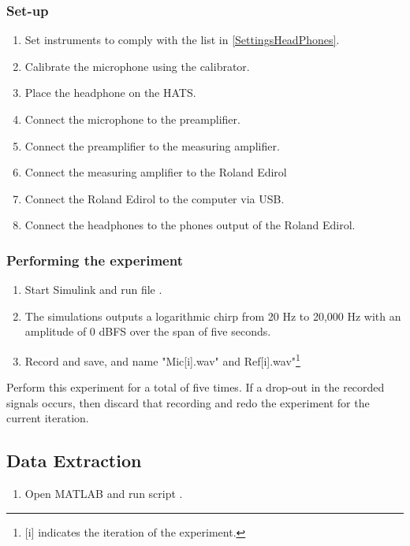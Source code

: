\subsubsection{Set-up}
\begin{enumerate}
	\item Set instruments to comply with the list in \ref{SettingsHeadPhones}.
	\item Calibrate the microphone using the calibrator.
	\item Place the headphone on the HATS.
	\item Connect the microphone to the preamplifier. 
	\item Connect the preamplifier to the measuring amplifier.
	\item Connect the measuring amplifier to the Roland Edirol 
	\item Connect the Roland Edirol to the computer via USB.
	\item Connect the headphones to the phones output of the Roland Edirol.
\end{enumerate}

\subsubsection{Performing the experiment}
\begin{enumerate}
	\item Start Simulink \textsuperscript{\textregistered} and run file  .
	\item The simulations outputs a logarithmic chirp from 20 Hz to 20,000 Hz with an amplitude of 0 dBFS over the span of five seconds.
	\item Record and save, and name "Mic[i].wav" and Ref[i].wav"\footnote{[i] indicates the iteration of the experiment.}
\end{enumerate}
Perform this experiment for a total of five times.
If  a drop-out in the recorded signals occurs, then discard that recording and redo the experiment for the current iteration.

\subsection{Data Extraction}
\begin{enumerate}
	\item Open MATLAB\textsuperscript{\textregistered} and run script .
\end{enumerate}

